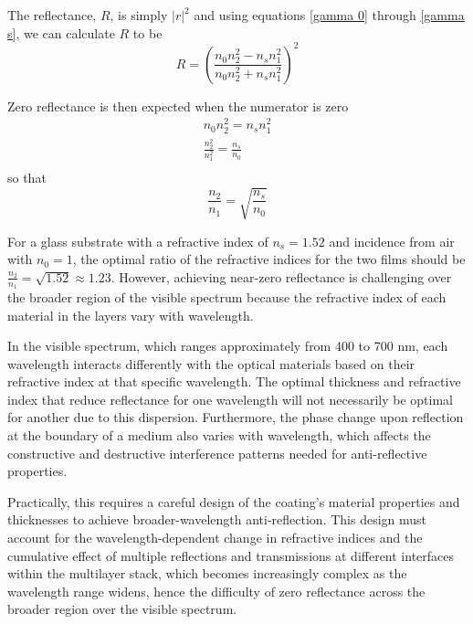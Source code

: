 The reflectance, $R$, is simply $|r|^2$ and using equations \ref{gamma 0} through \ref{gamma s}, we can calculate $R$ to be
    \begin{equation}\label{reflectance for 2-layer antireflecting films}
    R = \left(\frac{n_0n_2^2 - n_sn_1^2}{n_0n_2^2 + n_sn_1^2}\right)^2
    \end{equation}

Zero reflectance is then expected when the numerator is zero
    \begin{align*}
        n_0n_2^2 = n_sn_1^2 \\
        \frac{n_2^2}{n_1^2} = \frac{n_s}{n_0}  \\
    \end{align*} so that
    \begin{equation}\label{zero reflectance criterion}
    \frac{n_2}{n_1} = \sqrt{\frac{n_s}{n_0}}
    \end{equation}

For a glass substrate with a refractive index of $n_s = 1.52$ and incidence from air with $n_0 = 1$, the optimal ratio of the refractive indices for the two films should be $\frac{n_2}{n_1} = \sqrt{1.52} \approx 1.23$. However, achieving near-zero reflectance is challenging over the broader region of the visible spectrum because the refractive index of each material in the layers vary with wavelength.

In the visible spectrum, which ranges approximately from 400 to 700 nm, each wavelength interacts differently with the optical materials based on their refractive index at that specific wavelength. The optimal thickness and refractive index that reduce reflectance for one wavelength will not necessarily be optimal for another due to this dispersion. Furthermore, the phase change upon reflection at the boundary of a medium also varies with wavelength, which affects the constructive and destructive interference patterns needed for anti-reflective properties.

Practically, this requires a careful design of the coating's material properties and thicknesses to achieve broader-wavelength anti-reflection. This design must account for the wavelength-dependent change in refractive indices and the cumulative effect of multiple reflections and transmissions at different interfaces within the multilayer stack, which becomes increasingly complex as the wavelength range widens, hence the difficulty of zero reflectance across the broader region over the visible spectrum.

